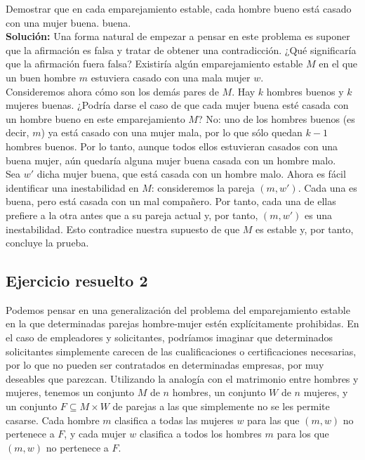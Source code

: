 \documentclass{article}
\begin{document}
Demostrar que en cada emparejamiento estable, cada hombre bueno está casado con una mujer buena. buena.\\ 

\textbf{Solución:} Una forma natural de empezar a pensar en este problema es suponer que la afirmación es falsa y tratar de obtener una contradicción. ¿Qué significaría que la afirmación fuera falsa? Existiría algún emparejamiento estable $M$ en el que un buen hombre $m$ estuviera casado con una mala mujer $w$.\\

Consideremos ahora cómo son los demás pares de $M$. Hay $k$ hombres buenos y $k$ mujeres buenas. ¿Podría darse el caso de que cada mujer buena esté casada con un hombre bueno en este emparejamiento $M$? No: uno de los hombres buenos (es decir, $m$) ya está casado con una mujer mala, por lo que sólo quedan $k - 1$ hombres buenos. Por lo tanto, aunque todos ellos estuvieran casados con una buena mujer, aún quedaría alguna mujer buena casada con un hombre malo.\\

Sea $w'$ dicha mujer buena, que está casada con un hombre malo. Ahora es fácil identificar una inestabilidad en $M$: consideremos la pareja $(m, w')$. Cada una es buena, pero está casada con un mal compañero. Por tanto, cada una de ellas prefiere a la otra antes que a su pareja actual y, por tanto, $(m, w')$ es una inestabilidad. Esto contradice nuestra supuesto de que $M$ es estable y, por tanto, concluye la prueba.

\newpage

\subsection{Ejercicio resuelto 2}
Podemos pensar en una generalización del problema del emparejamiento estable en la que determinadas parejas hombre-mujer estén explícitamente prohibidas. En el caso de empleadores y solicitantes, podríamos imaginar que determinados solicitantes simplemente carecen de las cualificaciones o certificaciones necesarias, por lo que no pueden ser contratados en determinadas empresas, por muy deseables que parezcan. Utilizando la analogía con el matrimonio entre hombres y mujeres, tenemos un conjunto $M$ de $n$ hombres, un conjunto $W$ de $n$ mujeres, y un conjunto $F \subseteq M \times W$ de parejas a las que simplemente no se les permite casarse. Cada hombre $m$ clasifica a todas las mujeres $w$ para las que $(m, w)$ no pertenece a $F$, y cada mujer $w$ clasifica a todos los hombres $m$ para los que $(m, w)$ no pertenece a $F$.\\
\end{document}
